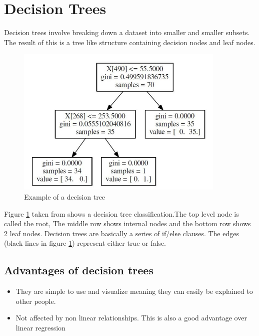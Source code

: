 \section{Decision Trees}

Decision trees involve breaking down a dataset into smaller and smaller subsets. The result of this is a tree like structure containing decision nodes and leaf nodes.

\begin{figure}[H]
  \centering
  \includegraphics[scale=0.5,width=100mm]{./images/decision-tree-example.jpg}
  \caption{Example of a decision tree}
  \label{fig:abalone-decision-tree}
\end{figure}

Figure \ref{fig:abalone-decision-tree} taken from \cite{decisionTreeExample} shows a decision tree classification.The top level node is called the root, The middle row shows internal nodes and the bottom row shows 2 leaf nodes. Decision trees are basically a series of if/else clauses. The edges (black lines in figure \ref{fig:abalone-decision-tree}) represent either true or false.

\subsection{Advantages of decision trees}

\begin{itemize}
  \item They are simple to use and visualize meaning they can easily be explained to other people. 
  \item Not affected by non linear relationships. This is also a good advantage over linear regression
\end{itemize}
